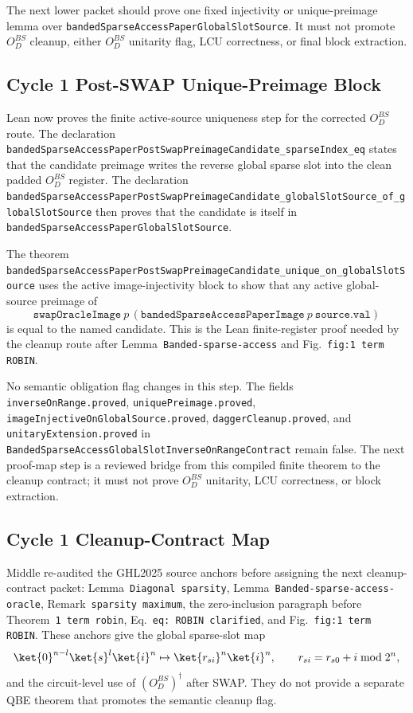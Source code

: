 The next lower packet should prove one fixed injectivity or unique-preimage
lemma over \texttt{bandedSparseAccessPaperGlobalSlotSource}.  It must not
promote \(O_D^{BS}\) cleanup, either \(O_D^{BS}\) unitarity flag, LCU
correctness, or final block extraction.

\subsection{Cycle 1 Post-SWAP Unique-Preimage Block}

Lean now proves the finite active-source uniqueness step for the corrected
\(O_D^{BS}\) route.  The declaration
\texttt{bandedSparseAccessPaperPostSwapPreimageCandidate\_sparseIndex\_eq}
states that the candidate preimage writes the reverse global sparse slot into
the clean padded \(O_D^{BS}\) register.  The declaration
\texttt{bandedSparseAccessPaperPostSwapPreimageCandidate\_globalSlotSource\_of\_globalSlotSource}
then proves that the candidate is itself in
\texttt{bandedSparseAccessPaperGlobalSlotSource}.

The theorem
\texttt{bandedSparseAccessPaperPostSwapPreimageCandidate\_unique\_on\_globalSlotSource}
uses the active image-injectivity block to show that any active global-source
preimage of
\[
  \texttt{swapOracleImage}\ p\,
  (\texttt{bandedSparseAccessPaperImage}\ p\ \texttt{source.val})
\]
is equal to the named candidate.  This is the Lean finite-register proof
needed by the cleanup route after Lemma~\texttt{Banded-sparse-access} and
Fig.~\texttt{fig:1 term ROBIN}.

No semantic obligation flag changes in this step.  The fields
\texttt{inverseOnRange.proved}, \texttt{uniquePreimage.proved},
\texttt{imageInjectiveOnGlobalSource.proved}, \texttt{daggerCleanup.proved},
and \texttt{unitaryExtension.proved} in
\texttt{BandedSparseAccessGlobalSlotInverseOnRangeContract} remain false.
The next proof-map step is a reviewed bridge from this compiled finite theorem
to the cleanup contract; it must not prove \(O_D^{BS}\) unitarity, LCU
correctness, or block extraction.

\subsection{Cycle 1 Cleanup-Contract Map}

Middle re-audited the GHL2025 source anchors before assigning the next
cleanup-contract packet: Lemma~\texttt{Diagonal sparsity},
Lemma~\texttt{Banded-sparse-access-oracle},
Remark~\texttt{sparsity maximum}, the zero-inclusion paragraph before
Theorem~\texttt{1 term robin}, Eq.~\texttt{eq: ROBIN clarified}, and
Fig.~\texttt{fig:1 term ROBIN}.  These anchors give the global sparse-slot
map
\[
  \ket{0}^{n-l}\ket{s}^l\ket{i}^n
  \mapsto
  \ket{r_{si}}^n\ket{i}^n,
  \qquad
  r_{si}=r_{s0}+i \bmod 2^n,
\]
and the circuit-level use of \((O_D^{BS})^\dagger\) after SWAP.  They do not
provide a separate QBE theorem that promotes the semantic cleanup flag.

